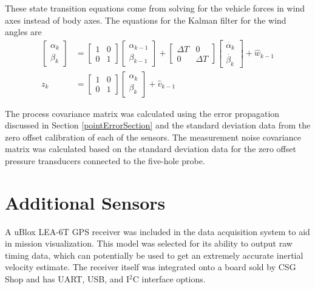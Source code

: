 These state transition equations come from solving for the vehicle forces in wind axes instead of body axes\cite{klein2006aircraft}. The equations for the Kalman filter for the wind angles are
\begin{align}
\begin{bmatrix}
\alpha_k\\\beta_k
\end{bmatrix} &= \begin{bmatrix}
1& 0\\0&1
\end{bmatrix}\begin{bmatrix}
\alpha_{k-1}\\\beta_{k-1}
\end{bmatrix}+\begin{bmatrix}
\Delta T& 0\\0&\Delta T
\end{bmatrix}\begin{bmatrix}
\dot{\alpha_{k}}\\\dot{\beta_{k}}
\end{bmatrix}+\hat{w}_{k-1}\\
z_k & = \begin{bmatrix}
1 & 0\\0&1
\end{bmatrix}\begin{bmatrix}
\alpha_{k}\\
\beta_{k}
\end{bmatrix}+\hat{v}_{k-1}
\end{align}

The process covariance matrix was calculated using the error propagation discussed in Section \ref{pointErrorSection} and the standard deviation data from the zero offset calibration of each of the sensors. The measurement noise covariance matrix was calculated based on the standard deviation data for the zero offset pressure transducers connected to the five-hole probe.


\section{Additional Sensors}
A uBlox LEA-6T GPS receiver was included in the data acquisition system to aid in mission visualization. This model was selected for its ability to output raw timing data, which can potentially be used to get an extremely accurate inertial velocity estimate\cite{ubloxDemo}. The receiver itself was integrated onto a board sold by CSG Shop and has UART, USB, and I$^2$C interface options. 

